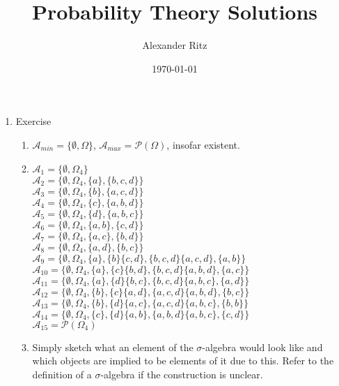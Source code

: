 \documentclass[12pt,a4paper]{article}
\title{Probability Theory Solutions}
\author{Alexander Ritz}
\date{\today}
\begin{document}
\maketitle

\begin{enumerate}

\item Exercise 
\begin{enumerate}[label=(\roman*)]

\item $\mathscr{A}_{min} = \{\emptyset, \Omega\}$, $\mathscr{A}_{max} = \mathcal{P}(\Omega)$, insofar existent.

\item $\mathscr{A}_{1} = \{\emptyset, \Omega_4\}$ \\ $\mathscr{A}_{2} = \{\emptyset, \Omega_4, \{a\}, \{b, c, d\}\}$ \\ $\mathscr{A}_{3} = \{\emptyset, \Omega_4, \{b\}, \{a, c, d\}\}$ \\ $\mathscr{A}_{4} = \{\emptyset, \Omega_4, \{c\}, \{a, b, d\}\}$ \\ $\mathscr{A}_{5} = \{\emptyset, \Omega_4, \{d\}, \{a, b, c\}\}$ \\ $\mathscr{A}_{6} = \{\emptyset, \Omega_4, \{a, b\}, \{c, d\}\}$ \\ $\mathscr{A}_{7} = \{\emptyset, \Omega_4, \{a, c\}, \{b, d\}\}$ \\ $\mathscr{A}_{8} = \{\emptyset, \Omega_4, \{a, d\}, \{b, c\}\}$ \\ $\mathscr{A}_{9} = \{\emptyset, \Omega_4, \{a\}, \{b\} \{c, d\}, \{b, c, d\} \{a, c, d\}, \{a, b\}\}$ \\ $\mathscr{A}_{10} = \{\emptyset, \Omega_4, \{a\}, \{c\} \{b, d\}, \{b, c, d\} \{a, b, d\}, \{a, c\}\}$ \\ $\mathscr{A}_{11} = \{\emptyset, \Omega_4, \{a\}, \{d\} \{b, c\}, \{b, c, d\} \{a, b, c\}, \{a, d\}\}$ \\ $\mathscr{A}_{12} = \{\emptyset, \Omega_4, \{b\}, \{c\} \{a, d\}, \{a, c, d\} \{a, b, d\}, \{b, c\}\}$ \\ $\mathscr{A}_{13} = \{\emptyset, \Omega_4, \{b\}, \{d\} \{a, c\}, \{a, c, d\} \{a, b, c\}, \{b, b\}\}$ \\ $\mathscr{A}_{14} = \{\emptyset, \Omega_4, \{c\}, \{d\} \{a, b\}, \{a, b, d\} \{a, b, c\}, \{c, d\}\}$ \\ $\mathscr{A}_{15} = \mathcal{P}(\Omega_4)$ 

\item Simply sketch what an element of the $\sigma$-algebra would look like and which objects are implied to be elements of it due to this. Refer to the definition of a $\sigma$-algebra if the construction is unclear.


\end{enumerate}
\end{enumerate}
\end{document}
